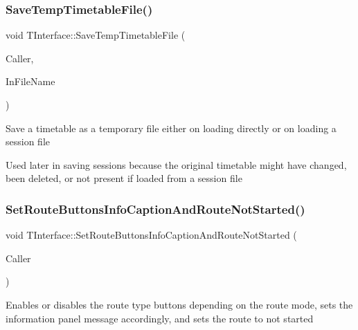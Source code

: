 \subsubsection{\texorpdfstring{Save\+Temp\+Timetable\+File()}{SaveTempTimetableFile()}}
{\footnotesize\ttfamily void T\+Interface\+::\+Save\+Temp\+Timetable\+File (\begin{DoxyParamCaption}\item[{int}]{Caller,  }\item[{Ansi\+String}]{In\+File\+Name }\end{DoxyParamCaption})\hspace{0.3cm}{\ttfamily [private]}}

Save a timetable as a temporary file either on loading directly or on loading a session file

Used later in saving sessions because the original timetable might have changed, been deleted, or not present if loaded from a session file \mbox{\label{class_t_interface_a89cc1839f77c2a867714cb52bd8d5cfe}} 
\subsubsection{\texorpdfstring{Set\+Route\+Buttons\+Info\+Caption\+And\+Route\+Not\+Started()}{SetRouteButtonsInfoCaptionAndRouteNotStarted()}}
{\footnotesize\ttfamily void T\+Interface\+::\+Set\+Route\+Buttons\+Info\+Caption\+And\+Route\+Not\+Started (\begin{DoxyParamCaption}\item[{int}]{Caller }\end{DoxyParamCaption})\hspace{0.3cm}{\ttfamily [private]}}

Enables or disables the route type buttons depending on the route mode, sets the information panel message accordingly, and sets the route to \textquotesingle{}not started\textquotesingle{} \mbox{\label{class_t_interface_a5c1caa770e377ec064458f42f6301ecd}} 
